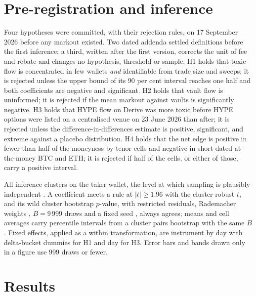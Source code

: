 \documentclass[a4paper,fleqn]{cas-dc}
\begin{document}
\section{Pre-registration and inference}\label{sec:prereg}
Four hypotheses were committed, with their rejection rules, on 17 September 2026 before any markout existed.
Two dated addenda settled definitions before the first inference; a third, written after
the first version, corrects the unit of fee and rebate and changes no hypothesis, threshold or sample. H1 holds that toxic flow is concentrated in few wallets \emph{and} identifiable from trade size and
sweeps; it is rejected unless the upper bound of its 90 per cent interval reaches one half and both coefficients are
negative and significant. H2 holds that vault flow is uninformed; it is rejected if the mean markout against vaults is
significantly negative. H3 holds that HYPE flow on Derive was more toxic before HYPE options were listed on a
centralised venue on 23 June 2026 than after; it is rejected unless the difference-in-differences estimate is
positive, significant, and extreme against a placebo distribution. H4 holds that the net edge is positive in
fewer than half of the moneyness-by-tenor cells and negative in short-dated at-the-money BTC and ETH; it is
rejected if half of the cells, or either of those, carry a positive interval.

All inference clusters on the taker wallet, the level at which sampling is plausibly independent
\citep{abadie2023}. A coefficient meets a rule at $|t| \geq 1.96$ with the cluster-robust $t$, and its wild cluster bootstrap
$p$-value, with restricted residuals, Rademacher weights \citep{cameron2008,mackinnon2017}, $B = 9\,999$ draws
and a fixed seed \citep{roodman2019}, always agrees; means and cell averages carry percentile intervals from a cluster pairs bootstrap with
the same $B$. Fixed effects, applied as a within transformation, are instrument by day with delta-bucket dummies for H1
and day for H3. Error bars and bands drawn only in a figure use 999 draws or fewer.

\section{Results}\label{sec:results}
\end{document}
